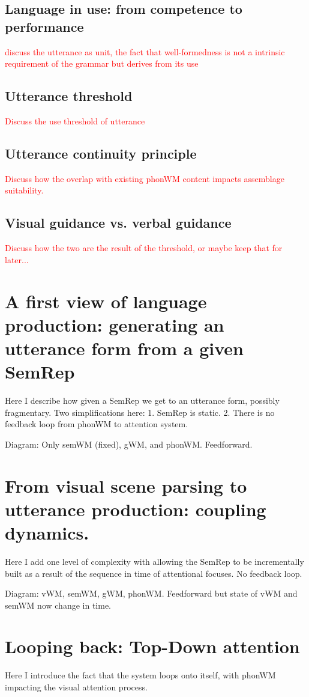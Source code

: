 \documentclass{article}
\newcommand\todo[1]{\textcolor{red}{#1}}
\begin{document}
\subsection{Language in use: from competence to performance}
\todo{discuss the utterance as unit, the fact that well-formedness is not a intrinsic requirement of the grammar but derives from its use}

\subsection{Utterance threshold}
\todo{Discuss the use threshold of utterance}

\subsection{Utterance continuity principle}
\todo{Discuss how the overlap with existing phonWM content impacts assemblage suitability.}

\subsection{Visual guidance vs. verbal guidance}
\todo{Discuss how the two are the result of the threshold, or maybe keep that for later...}


\section{A first view of language production: generating an utterance form from a given SemRep}
Here I describe how given a SemRep we get to an utterance form, possibly fragmentary.
Two simplifications here: 1. SemRep is static. 2. There is no feedback loop from phonWM to attention system.

Diagram: Only semWM (fixed), gWM, and phonWM. Feedforward.

\section{From visual scene parsing to utterance production: coupling dynamics.}
Here I add one level of complexity with allowing the SemRep to be incrementally built as a result of the sequence in time of attentional focuses. No feedback loop.

Diagram: vWM, semWM, gWM, phonWM. Feedforward but state of vWM and semWM now change in time.

\section{Looping back: Top-Down attention}
Here I introduce the fact that the system loops onto itself, with phonWM impacting the visual attention process.
\end{document}

